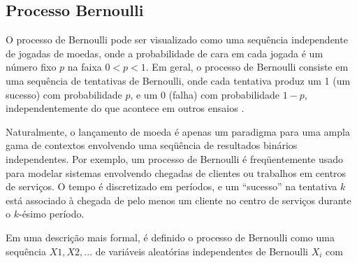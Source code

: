 







\subsection{Processo Bernoulli}

O processo de Bernoulli pode ser visualizado como uma sequência independente de jogadas de moedas, onde a probabilidade de cara em cada jogada é um número fixo $p$ na faixa $0 < p < 1$. Em geral, o processo de Bernoulli consiste em uma sequência de tentativas de Bernoulli, onde cada tentativa produz um 1 (um sucesso) com probabilidade $p$, e um 0 (falha) com probabilidade $1 - p$, independentemente do que acontece em outros ensaios \cite{bertsekas2008}.

Naturalmente, o lançamento de moeda é apenas um paradigma para uma ampla gama de contextos envolvendo uma seqüência de resultados binários independentes. Por exemplo, um processo de Bernoulli é freqüentemente usado para modelar sistemas envolvendo chegadas de clientes ou trabalhos em centros de serviços. O tempo é discretizado em períodos, e um “sucesso” na tentativa $k$ está associado à chegada de pelo menos um cliente no centro de serviços durante o $k$-ésimo período.

Em uma descrição mais formal, é definido o processo de Bernoulli como uma sequência $X1, X2, \dots$ de variáveis aleatórias independentes de Bernoulli $X_{i}$ com

